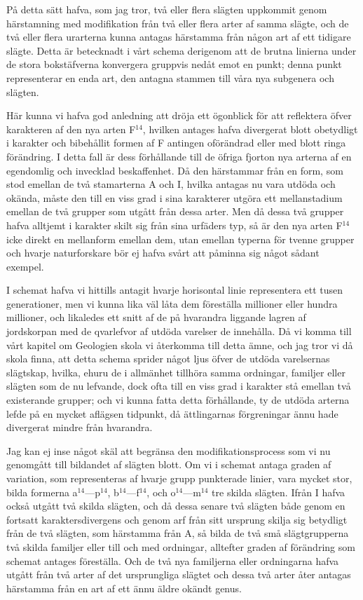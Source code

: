 På detta sätt hafva, som jag tror, två eller flera slägten uppkommit genom härstamning med modifikation från två eller flera arter af samma slägte, och de två eller flera urarterna kunna antagas härstamma från någon art af ett tidigare slägte. Detta är betecknadt i vårt schema derigenom att de brutna linierna under de stora bokstäfverna konvergera gruppvis nedåt emot en punkt; denna punkt representerar en enda art, den antagna stammen till våra nya subgenera och slägten.

Här kunna vi hafva god anledning att dröja ett ögonblick för att reflektera öfver karakteren af den nya arten F${}^{14}$, hvilken antages hafva divergerat blott obetydligt i karakter och bibehållit formen af F antingen oförändrad eller med blott ringa förändring. I detta fall är dess förhållande till de öfriga fjorton nya arterna af en egendomlig och invecklad beskaffenhet. Då den härstammar från en form, som stod emellan de två stamarterna A och I, hvilka antagas nu vara utdöda och okända, måste den till en viss grad i sina karakterer utgöra ett mellanstadium emellan de två grupper som utgått från dessa arter. Men då dessa två grupper hafva alltjemt i karakter skilt sig från sina urfäders typ, så är den nya arten F${}^{14}$ icke direkt en mellanform emellan dem, utan emellan typerna för tvenne grupper och hvarje naturforskare bör ej hafva svårt att påminna sig något sådant exempel.

I schemat hafva vi hittills antagit hvarje horisontal linie representera ett tusen generationer, men vi kunna lika väl låta dem föreställa millioner eller hundra millioner, och likaledes ett snitt af de på hvarandra liggande lagren af jordskorpan med de qvarlefvor af utdöda varelser de innehålla. Då vi komma till vårt kapitel om Geologien skola vi återkomma till detta ämne, och jag tror vi då skola finna, att detta schema sprider något ljus öfver de utdöda varelsernas slägtskap, hvilka, ehuru de i allmänhet tillhöra samma ordningar, familjer eller slägten som de nu lefvande, dock ofta till en viss grad i karakter stå emellan två existerande grupper; och vi kunna fatta detta förhållande, ty de utdöda arterna lefde på en mycket aflägsen tidpunkt, då ättlingarnas förgreningar ännu hade divergerat mindre från hvarandra.

Jag kan ej inse något skäl att begränsa den modifikationsprocess som vi nu genomgått till bildandet af slägten blott. Om vi i schemat antaga graden af variation, som representeras af hvarje grupp punkterade linier, vara mycket stor, bilda formerna a${}^{14}$—p${}^{14}$, b${}^{14}$—f${}^{14}$, och o${}^{14}$—m${}^{14}$ tre skilda slägten. Ifrån I hafva också utgått två skilda slägten, och då dessa senare två slägten både genom en fortsatt karaktersdivergens och genom arf från sitt ursprung skilja sig betydligt från de två slägten, som härstamma från A, så bilda de två små slägtgrupperna två skilda familjer eller till och med ordningar, alltefter graden af förändring som schemat antages föreställa. Och de två nya familjerna eller ordningarna hafva utgått från två arter af det ursprungliga slägtet och dessa två arter åter antagas härstamma från en art af ett ännu äldre okändt genus.

